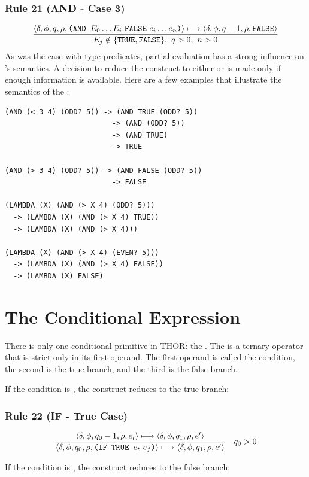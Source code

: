 \subsubsection*{Rule 21 (AND - Case 3)}
\[
\frac{\langle \delta,\phi,q,\rho,\texttt{(AND }E_0\ldots E_i\ \texttt{FALSE}\ e_i\ldots e_n\texttt{)}\rangle\longmapsto
      \langle \delta,\phi,q-1,\rho,\texttt{FALSE}\rangle}
     {E_j\notin\{\texttt{TRUE},\texttt{FALSE}\},\ q>0,\ n>0}
\]
As was the case with type predicates, partial evaluation has a strong influence
on 's semantics. A decision to reduce the  construct to
either  or  is made only if enough information is
available. Here are a few examples that illustrate the semantics of the
:
\begin{verbatim}
(AND (< 3 4) (ODD? 5)) -> (AND TRUE (ODD? 5))
                         -> (AND (ODD? 5))
                         -> (AND TRUE)
                         -> TRUE

(AND (> 3 4) (ODD? 5)) -> (AND FALSE (ODD? 5))
                         -> FALSE

(LAMBDA (X) (AND (> X 4) (ODD? 5)))
  -> (LAMBDA (X) (AND (> X 4) TRUE))
  -> (LAMBDA (X) (AND (> X 4)))

(LAMBDA (X) (AND (> X 4) (EVEN? 5)))
  -> (LAMBDA (X) (AND (> X 4) FALSE))
  -> (LAMBDA (X) FALSE)
\end{verbatim}

\section{The Conditional Expression}

There is only one conditional primitive in THOR: the . The 
is a ternary operator that is strict only in its first operand. The first
operand is called the condition, the second is the true branch, and the third is
the false branch.

If the condition is , the  construct reduces to the true
branch:

\subsubsection*{Rule 22 (IF - True Case)}
\[
\frac{
\langle \delta,\phi,q_0-1,\rho,e_t\rangle\longmapsto
\langle \delta,\phi,q_1,\rho,e'\rangle
}{
\langle \delta,\phi,q_0,\rho,\texttt{(IF TRUE }e_t\ e_f\texttt{)}\rangle\longmapsto
\langle \delta,\phi,q_1,\rho,e'\rangle
}
\quad q_0>0
\]

If the condition is , the  construct reduces to the false
branch:

